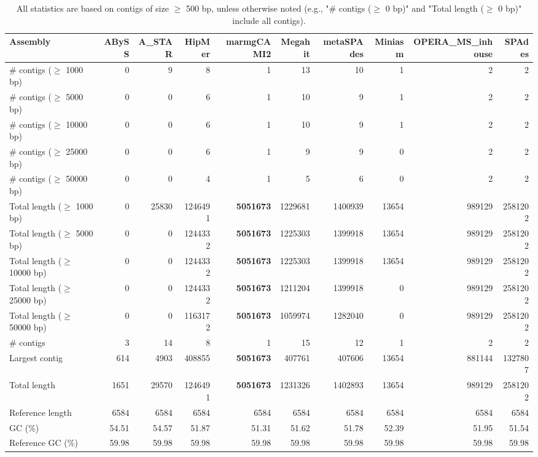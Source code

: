 \documentclass[12pt,a4paper]{article}
\begin{document}
\begin{table}[ht]
\begin{center}
\caption{All statistics are based on contigs of size $\geq$ 500 bp, unless otherwise noted (e.g., "\# contigs ($\geq$ 0 bp)" and "Total length ($\geq$ 0 bp)" include all contigs).}
\begin{tabular}{|l*{9}{|r}|}
\hline
Assembly & ABySS & A\_STAR & HipMer & marmgCAMI2 & Megahit & metaSPAdes & Miniasm & OPERA\_MS\_inhouse & SPAdes \\ \hline
\# contigs ($\geq$ 1000 bp) & 0 & 9 & 8 & 1 & 13 & 10 & 1 & 2 & 2 \\ \hline
\# contigs ($\geq$ 5000 bp) & 0 & 0 & 6 & 1 & 10 & 9 & 1 & 2 & 2 \\ \hline
\# contigs ($\geq$ 10000 bp) & 0 & 0 & 6 & 1 & 10 & 9 & 1 & 2 & 2 \\ \hline
\# contigs ($\geq$ 25000 bp) & 0 & 0 & 6 & 1 & 9 & 9 & 0 & 2 & 2 \\ \hline
\# contigs ($\geq$ 50000 bp) & 0 & 0 & 4 & 1 & 5 & 6 & 0 & 2 & 2 \\ \hline
Total length ($\geq$ 1000 bp) & 0 & 25830 & 1246491 & {\bf 5051673} & 1229681 & 1400939 & 13654 & 989129 & 2581202 \\ \hline
Total length ($\geq$ 5000 bp) & 0 & 0 & 1244332 & {\bf 5051673} & 1225303 & 1399918 & 13654 & 989129 & 2581202 \\ \hline
Total length ($\geq$ 10000 bp) & 0 & 0 & 1244332 & {\bf 5051673} & 1225303 & 1399918 & 13654 & 989129 & 2581202 \\ \hline
Total length ($\geq$ 25000 bp) & 0 & 0 & 1244332 & {\bf 5051673} & 1211204 & 1399918 & 0 & 989129 & 2581202 \\ \hline
Total length ($\geq$ 50000 bp) & 0 & 0 & 1163172 & {\bf 5051673} & 1059974 & 1282040 & 0 & 989129 & 2581202 \\ \hline
\# contigs & 3 & 14 & 8 & 1 & 15 & 12 & 1 & 2 & 2 \\ \hline
Largest contig & 614 & 4903 & 408855 & {\bf 5051673} & 407761 & 407606 & 13654 & 881144 & 1327807 \\ \hline
Total length & 1651 & 29570 & 1246491 & {\bf 5051673} & 1231326 & 1402893 & 13654 & 989129 & 2581202 \\ \hline
Reference length & 6584 & 6584 & 6584 & 6584 & 6584 & 6584 & 6584 & 6584 & 6584 \\ \hline
GC (\%) & 54.51 & 54.57 & 51.87 & 51.31 & 51.62 & 51.78 & 52.39 & 51.95 & 51.54 \\ \hline
Reference GC (\%) & 59.98 & 59.98 & 59.98 & 59.98 & 59.98 & 59.98 & 59.98 & 59.98 & 59.98 \\ \hline

\end{tabular}
\end{center}
\end{table}
\end{document}

